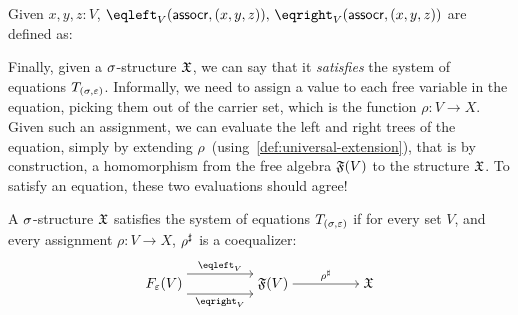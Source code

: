 \begin{example}
Given $x, y, z : V$, $\eqleft_{V}(\term{assocr}, (x,y,z)),\,\eqright_{V}(\term{assocr}, (x,y,z))$
are defined as:
\begin{center}
\end{center}
\end{example}
Finally, given a $\sigma$-structure $\mathfrak{X}$,
we can say that it \emph{satisfies} the system of equations $T_{(\sigma,\varepsilon)}$.
%
Informally, we need to assign a value to each free variable in the equation, picking them out of the carrier set,
which is the function $\rho : V \to X$.
%
Given such an assignment, we can evaluate the left and right trees of the equation,
simply by extending $\rho\,$ (using~\cref{def:universal-extension}),
that is by construction, a homomorphism from the free algebra $\mathfrak{F}(V)$ to the structure $\mathfrak{X}$.
%
To satisfy an equation, these two evaluations should agree!
%

\begin{definition}
    A $\sigma$-structure $\mathfrak{X}$ satisfies the system of equations $T_{(\sigma,\varepsilon)}$ if for every set $V$,
    and every assignment $\rho : V \to X$, ${\rho}^{\sharp}$ is a coequalizer:
    \[\begin{tikzcd}[ampersand replacement=\&,cramped]
            {\EqSig(V)} \&\& {\str{F}(V)} \&\& {\str{X}}
            \arrow["{\ext{\rho}}", from=1-3, to=1-5]
            \arrow["{\eqleft_{V}}", shift left=3, from=1-1, to=1-3]
            \arrow["{\eqright_{V}}"', shift right=3, from=1-1, to=1-3]
        \end{tikzcd}\]
\end{definition}

